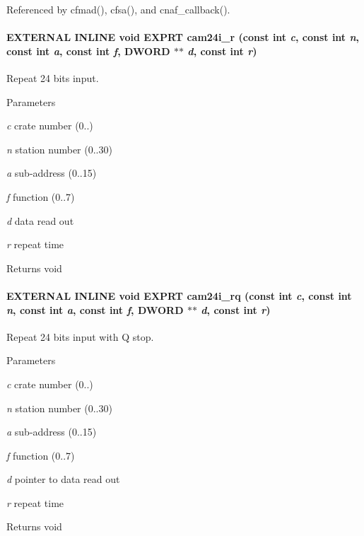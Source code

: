 Referenced by cfmad(), cfsa(), and cnaf\_\-callback().
\paragraph[{cam24i\_\-r}]{\setlength{\rightskip}{0pt plus 5cm}EXTERNAL INLINE void EXPRT cam24i\_\-r (const int {\em c}, \/  const int {\em n}, \/  const int {\em a}, \/  const int {\em f}, \/  {\bf DWORD} $\ast$$\ast$ {\em d}, \/  const int {\em r})}\hfill\label{group__mcstdfunctionh_gafe207e922a73f0b30e290e830808ec61}
Repeat 24 bits input. 
\begin{DoxyParams}{Parameters}
\item[{\em c}]crate number (0..) \item[{\em n}]station number (0..30) \item[{\em a}]sub-\/address (0..15) \item[{\em f}]function (0..7) \item[{\em d}]data read out \item[{\em r}]repeat time \end{DoxyParams}
\begin{DoxyReturn}{Returns}
void 
\end{DoxyReturn}
\paragraph[{cam24i\_\-rq}]{\setlength{\rightskip}{0pt plus 5cm}EXTERNAL INLINE void EXPRT cam24i\_\-rq (const int {\em c}, \/  const int {\em n}, \/  const int {\em a}, \/  const int {\em f}, \/  {\bf DWORD} $\ast$$\ast$ {\em d}, \/  const int {\em r})}\hfill\label{group__mcstdfunctionh_ga6a2d5a0785b2ccc27fc9e2769f749b10}
Repeat 24 bits input with Q stop. 
\begin{DoxyParams}{Parameters}
\item[{\em c}]crate number (0..) \item[{\em n}]station number (0..30) \item[{\em a}]sub-\/address (0..15) \item[{\em f}]function (0..7) \item[{\em d}]pointer to data read out \item[{\em r}]repeat time \end{DoxyParams}
\begin{DoxyReturn}{Returns}
void 
\end{DoxyReturn}


